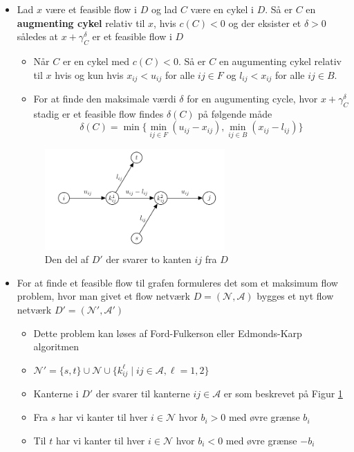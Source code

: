 \begin{itemize}
  \item Lad $x$ være et feasible flow i $D$ og lad $C$ være en cykel i $D$. Så er $C$ en 
\textbf{augmenting cykel} relativ til $x$, hvis $c(C)<0$ og der eksister et $\delta > 0$ således at $x+\gamma_C^\delta$ er et feasible flow i $D$
  \begin{itemize}
    \item Når $C$ er en cykel med $c(C)<0$. Så er $C$ en augumenting cykel relativ til $x$ hvis og kun hvis $x_{ij} < u_{ij}$ for alle $ij \in F$ og $l_{ij} < x_{ij}$ for alle $ij \in B$.
    \item For at finde den maksimale værdi $\delta$ for en augumenting cycle, hvor $x + \gamma_C^\delta$ stadig er et feasible flow findes $\delta(C)$ på følgende måde
    \begin{equation*}
      \delta(C) = \min \bigg\{\min_{ij \in F}(u_{ij}-x_{ij}), \min_{ij \in B}(x_{ij}-l_{ij})\bigg\}
    \end{equation*}
  \end{itemize} 
  \begin{figure}[h]
    \centering
    \includegraphics[width=260px]{img/edge_feasible}
    \caption{Den del af $D'$ der svarer to kanten $ij$ fra $D$ \label{edge-flow}}
  \end{figure}
  \item For at finde et feasible flow til grafen formuleres det som et maksimum flow problem, hvor man givet et flow netværk $D=(\mathcal N, \mathcal A)$ bygges et nyt flow netværk $D' = (\mathcal N', \mathcal A')$
  \begin{itemize}
  	\item Dette problem kan løses af Ford-Fulkerson eller Edmonds-Karp algoritmen
		\item $\mathcal N' = \{s,t\} \cup \mathcal N \cup \{k_{ij}^\ell \mid ij \in \mathcal A, \ell = 1,2\}$
    \item Kanterne i $D'$ der svarer til kanterne $ij \in \mathcal A$ er som beskrevet på Figur \ref{edge-flow}
    \item Fra $s$ har vi kanter til hver $i \in \mathcal N$ hvor $b_i > 0$ med øvre grænse $b_i$ 
    \item Til $t$ har vi kanter til hver $i \in \mathcal N$ hvor $b_i < 0$ med øvre grænse $-b_i$ 

\end{itemize}
\end{itemize}
